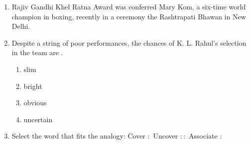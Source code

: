 \documentclass[journal,12pt,onecolumn]{IEEEtran}
\theoremstyle{remark}
\begin{document}
\begin{enumerate}[start=1, label=Q.\arabic*]

\item Rajiv Gandhi Khel Ratna Award was conferred \underline{\hspace{1cm}} Mary Kom, a six-time world champion in boxing, recently in a ceremony \underline{\hspace{1cm}} the Rashtrapati Bhawan  in New Delhi.

\begin{enumerate}
\end{enumerate}

\hfill{}

\item Despite a string of poor performances, the chances of K. L. Rahul’s selection in the team are \underline{\hspace{2cm}}.

\begin{enumerate}
\item slim
\item bright
\item obvious
\item uncertain
\end{enumerate}

\hfill{}

\item Select the word that fits the analogy:  
Cover $:$ Uncover $:$$:$ Associate $:$ \underline{\hspace{2cm}}

\begin{enumerate}
\end{enumerate}

\hfill{}


\end{enumerate}
\end{document}
